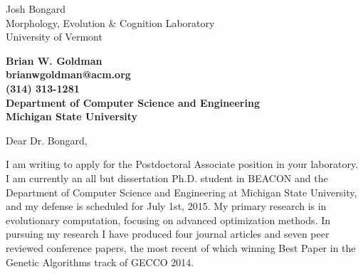 \documentclass[11pt]{letter} %
\begin{document}

\begin{letter}{
Josh Bongard \\
Morphology, Evolution \& Cognition Laboratory \\
University of Vermont} 


\begin{center}
\large\bf Brian W. Goldman \\ %
brianwgoldman@acm.org \\ (314) 313-1281 \\ Department of Computer Science and Engineering \\ Michigan State University %
\end{center} 
\vfill

\signature{Brian W. Goldman} %


\opening{Dear Dr. Bongard,} 
 
I am writing to apply for the Postdoctoral Associate position in your laboratory.
I am currently an all but dissertation Ph.D. student in BEACON and the Department of Computer Science and Engineering at Michigan State University,
and my defense is scheduled for July 1st, 2015. My primary research is in evolutionary computation,
focusing on advanced optimization methods.
In pursuing my research I have produced four journal articles and seven peer reviewed conference papers,
the most recent of which winning Best Paper in the Genetic Algorithms track of GECCO 2014.


\end{letter}
\end{document}
